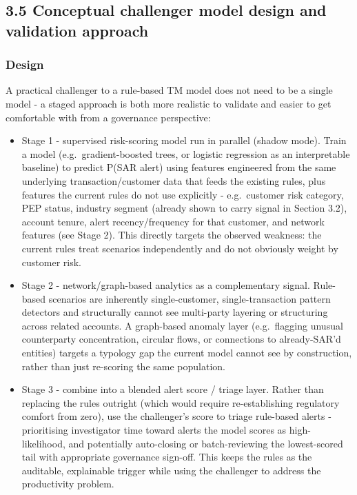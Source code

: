 \documentclass[
]{article}
\begin{document}
\subsection{3.5 Conceptual challenger model design and validation
approach}\label{conceptual-challenger-model-design-and-validation-approach}

\subsubsection{Design}\label{design}

A practical challenger to a rule-based TM model does not need to be a
single model - a staged approach is both more realistic to validate and
easier to get comfortable with from a governance perspective:

\begin{itemize}
\item
  Stage 1 - supervised risk-scoring model run in parallel (shadow mode).
  Train a model (e.g.~gradient-boosted trees, or logistic regression as
  an interpretable baseline) to predict P(SAR \textbar{} alert) using
  features engineered from the same underlying transaction/customer data
  that feeds the existing rules, plus features the current rules do not
  use explicitly - e.g.~customer risk category, PEP status, industry
  segment (already shown to carry signal in Section 3.2), account
  tenure, alert recency/frequency for that customer, and network
  features (see Stage 2). This directly targets the observed weakness:
  the current rules treat scenarios independently and do not obviously
  weight by customer risk.
\item
  Stage 2 - network/graph-based analytics as a complementary signal.
  Rule-based scenarios are inherently single-customer,
  single-transaction pattern detectors and structurally cannot see
  multi-party layering or structuring across related accounts. A
  graph-based anomaly layer (e.g.~flagging unusual counterparty
  concentration, circular flows, or connections to already-SAR'd
  entities) targets a typology gap the current model cannot see by
  construction, rather than just re-scoring the same population.
\item
  Stage 3 - combine into a blended alert score / triage layer. Rather
  than replacing the rules outright (which would require re-establishing
  regulatory comfort from zero), use the challenger's score to triage
  rule-based alerts - prioritising investigator time toward alerts the
  model scores as high-likelihood, and potentially auto-closing or
  batch-reviewing the lowest-scored tail with appropriate governance
  sign-off. This keeps the rules as the auditable, explainable trigger
  while using the challenger to address the productivity problem.
\end{itemize}
\end{document}
